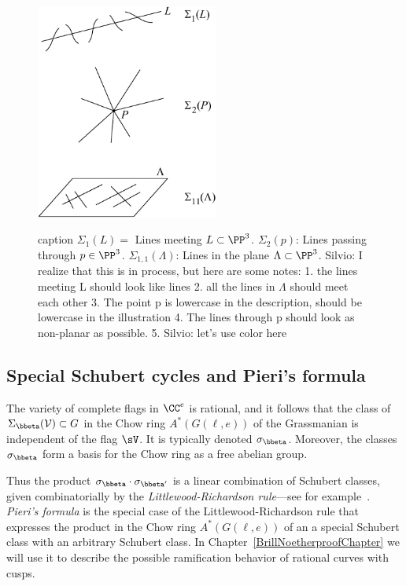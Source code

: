 \begin{figure}
\inprogress
\centerline {\includegraphics[height=2.8in]{"main/Fig12-2"}}
caption{
$\Sigma_{1}(L) =$ Lines meeting $L\subset\PP^3$.
$\Sigma_{2}(p)$: Lines passing through $p\in\PP^3$.
$\Sigma_{1,1}(\Lambda)$: Lines in the plane $\Lambda\subset \PP^3$.
{Silvio: I realize that this is in process, but here are some notes:
1. the lines meeting L should look like lines
2. all the lines in $\Lambda$ should meet each other
3. The point p is lowercase in the description, should be lowercase in the illustration
4. The lines through p should look as non-planar as possible.
5. {Silvio: let's use color here}}}
\label{Schubert cycles in G(2,4).}\end{figure}

\subsection{Special Schubert cycles and Pieri's formula}

\begin{fact}
The variety of complete flags in $\CC^e$ is rational, and it follows that the class of $\Sigma_{\bbeta}({\cal V})\subset G$
in the Chow ring $A^*(G(\ell, e))$ of the Grassmanian
is independent
of the flag $\sV$. It is typically denoted $\sigma_{\bbeta}$. Moreover, the classes $\sigma_{\bbeta}$ form a basis for the Chow ring as a free abelian group.
\end{fact}

Thus the product $\sigma_{\bbeta} \cdot \sigma_{\bbeta'}$ is a linear combination of Schubert classes,
given combinatorially by the \emph{Littlewood-Richardson rule}---see for example~\cite{MR2247964}.
\emph{Pieri's formula} is the special
case of the Littlewood-Richardson rule that expresses the product in the Chow ring $A^*(G(\ell, e))$ of an a special Schubert class with an arbitrary Schubert class.
In Chapter~\ref{BrillNoetherproofChapter} we will use it to describe the possible ramification behavior of rational curves with cusps.

